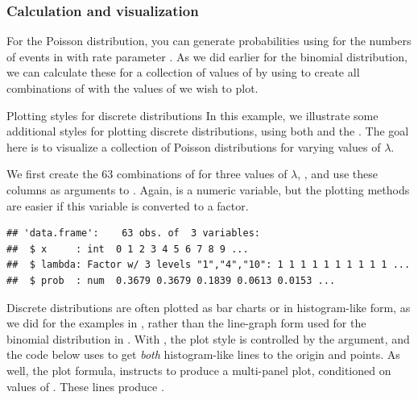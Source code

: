 \documentclass[11pt]{book}
\renewenvironment{knitrout}{\small\renewcommand{\baselinestretch}{.85}}{} %
\begin{document}
\subsubsection{Calculation and visualization}
For the Poisson distribution, you can generate probabilities using
 for the numbers of events in  with
rate parameter . As we did earlier for the binomial 
distribution, we can calculate these for a collection of values
of  by using  to create all combinations
of with the values of  we wish to plot.

\begin{Example}{Plotting styles for discrete distributions}
In this example, we illustrate some additional styles for plotting discrete
distributions, using both   and the
.  The goal here is to visualize a collection of
Poisson distributions for varying values of $\lambda$.

We first create the 63 combinations of  for
three values of $\lambda$, , and use these
columns as arguments to .  Again,  is
a numeric variable, but the plotting methods are easier if this
variable is converted to a factor.
\begin{knitrout}
\color{fgcolor}\begin{kframe}
\begin{alltt}
 \hlkwb{<-}\hlstd{(}\hlstd{=}\hlopt{:}\hlstd{,} \hlstd{=}\hlstd{(}\hlstd{,} \hlstd{,} \hlstd{))}
 \hlkwb{<-}  \hlstd{=}\hlstd{(XL[,}\hlstd{], XL[,}\hlstd{]))}
\hlopt{$} \hlkwb{=} \hlopt{$}
\end{alltt}
\begin{verbatim}
## 'data.frame':	63 obs. of  3 variables:
##  $ x     : int  0 1 2 3 4 5 6 7 8 9 ...
##  $ lambda: Factor w/ 3 levels "1","4","10": 1 1 1 1 1 1 1 1 1 1 ...
##  $ prob  : num  0.3679 0.3679 0.1839 0.0613 0.0153 ...
\end{verbatim}
\end{kframe}
\end{knitrout}

Discrete distributions are often plotted as bar charts or in histogram-like
form, as we did for the examples in ,
rather than the line-graph form used for the binomial distribution in 
.  With , the plot style is controlled
by the  argument, and the code below uses 
to get \emph{both} histogram-like lines to the origin and points.
As well, the plot formula,  instructs 
to produce a multi-panel plot, conditioned on values of .
These lines produce .


\end{Example}
\end{document}
